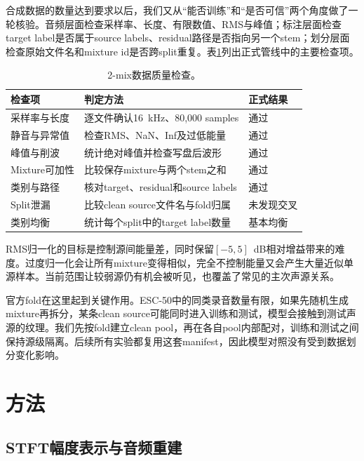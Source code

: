 \documentclass[UTF8,12pt,a4paper]{ctexart}
\begin{document}
合成数据的数量达到要求以后，我们又从“能否训练”和“是否可信”两个角度做了一轮核验。音频层面检查采样率、长度、有限数值、RMS与峰值；标注层面检查target label是否属于source labels、residual路径是否指向另一个stem；划分层面检查原始文件名和mixture id是否跨split重复。表\ref{tab:data-check}列出正式管线中的主要检查项。

\begin{table}[H]
  \centering
  \caption{2-mix数据质量检查。}
  \label{tab:data-check}
  \small
  \begin{tabularx}{0.95\textwidth}{p{3.0cm}X p{2.0cm}}
    \toprule
    检查项 & 判定方法 & 正式结果 \\
    \midrule
    采样率与长度 & 逐文件确认16~kHz、80,000 samples & 通过 \\
    静音与异常值 & 检查RMS、NaN、Inf及过低能量 & 通过 \\
    峰值与削波 & 统计绝对峰值并检查写盘后波形 & 通过 \\
    Mixture可加性 & 比较保存mixture与两个stem之和 & 通过 \\
    类别与路径 & 核对target、residual和source labels & 通过 \\
    Split泄漏 & 比较clean source文件名与fold归属 & 未发现交叉 \\
    类别均衡 & 统计每个split中的target label数量 & 基本均衡 \\
    \bottomrule
  \end{tabularx}
\end{table}

RMS归一化的目标是控制源间能量差，同时保留$[-5,5]$~dB相对增益带来的难度。过度归一化会让所有mixture变得相似，完全不控制能量又会产生大量近似单源样本。当前范围让较弱源仍有机会被听见，也覆盖了常见的主次声源关系。

官方fold在这里起到关键作用。ESC-50中的同类录音数量有限，如果先随机生成mixture再拆分，某条clean source可能同时进入训练和测试，模型会接触到测试声源的纹理。我们先按fold建立clean pool，再在各自pool内部配对，训练和测试之间保持源级隔离。后续所有实验都复用这套manifest，因此模型对照没有受到数据划分变化影响。

\section{方法}

\subsection{STFT幅度表示与音频重建}
\end{document}
